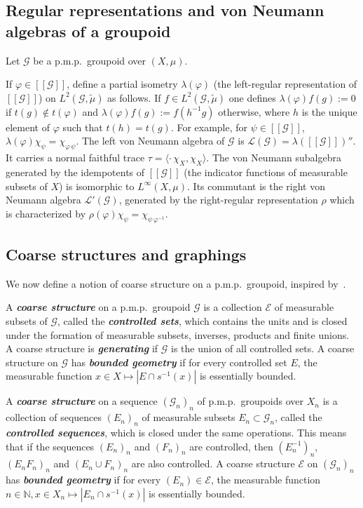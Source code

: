 \documentclass[AHL,Unicode,longabstracts,published]{cedram}
\newcommand{\defin}[1]{\textbf{\emph{#1}}}
\newcommand{\Nmath}{\mathbb{N}}
\newcommand{\coarse}{\mathcal{E}}
\newcommand{\LL}{\mathcal{L}}
\newcommand{\cg}{\mathcal{G}}
\newcommand{\ph}{\varphi}
\newcommand{\pmp}{p.m.p.\ }
\begin{document}
\subsection{Regular representations and von Neumann algebras of a groupoid}\label{sec:vn}

Let $\cg$ be a \pmp groupoid over $(X,\mu)$.

If $\ph\in [[\cg]]$, define a partial isometry $\lambda(\ph)$ (the left-regular representation of $[[\cg]]$) on $L^2(\cg,\widetilde \mu)$ as follows. If $f \in L^2(\cg,\widetilde \mu)$ one defines $\lambda(\ph)f(g) := 0$ if $t(g) \notin t(\ph)$ and $\lambda(\ph)f(g) := f(h^{-1}g)$ otherwise, where $h$ is the unique element of $\ph$ such that $t(h)=t(g)$. For example, for $\psi\in [[\cg]]$, $\lambda(\ph)\chi_\psi = \chi_{\ph\,\psi}$. The left von Neumann algebra of $\cg$ is $\LL(\cg)=\lambda([[\cg]])''$. It carries a normal faithful trace $\tau = \langle \cdot\,\chi_X,\chi_X\rangle$. The von Neumann subalgebra generated by the idempotents of $[[\cg]]$ (the indicator functions of measurable subsets of $X$) is isomorphic to $L^\infty(X,\mu)$. Its commutant is the right von Neumann algebra $\LL'(\cg)$, generated by the right-regular representation $\rho$ which is characterized by $\rho(\ph)\chi_\psi = \chi_{\psi\,\ph^{-1}}$.

\subsection{Coarse structures and graphings}\label{subsect : coarse structures and graphings}
We now define a notion of coarse structure on a \pmp groupoid, inspired by~\cite{Roe-2003}.
\begin{defi}
A \defin{coarse structure} on a \pmp groupoid $\cg$ is a collection $\coarse$ of measurable subsets of $\cg$, called the \defin{controlled sets}, which contains the units and is closed under the formation of measurable subsets, inverses, products and finite unions. A coarse structure is \defin{generating} if $\cg$ is the union of all controlled sets. A coarse structure on $\cg$ has
\defin{bounded geometry} if for every controlled set $E$, the measurable function $x \in X \mapsto |E \cap s^{-1}(x)|$ is essentially bounded.

A \defin{coarse structure} on a sequence $(\cg_n)_n$ of \pmp groupoids over $X_n$ is a collection of sequences $(E_n)_n$ of measurable subsets $E_n \subset \cg_n$, called the
\defin{controlled sequences}, which is closed under the same operations. This means that if the sequences $(E_n)_n$ and $(F_n)_n$ are controlled, then $(E_n^{-1})_n$, $(E_n F_n)_n$ and $(E_n \cup F_n)_n$ are also controlled. A coarse structure $\coarse$ on $(\cg_n)_n$ has \defin{bounded geometry} if for every $(E_n) \in \coarse$, the measurable function $n \in \Nmath,x \in X_n \mapsto |E_n \cap s^{-1}(x)|$ is essentially bounded.
\end{defi}
\end{document}
